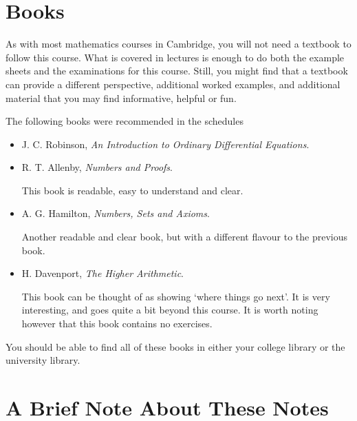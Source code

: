 \documentclass[a4paper]{scrreprt}
\begin{document}
\section{Books}

As with most mathematics courses in Cambridge, you will not need a textbook to follow this course. What is covered in lectures is enough to do both the example sheets and the examinations for this course. Still, you might find that a textbook can provide a different perspective, additional worked examples, and additional material that you may find informative, helpful or fun.

The following books were recommended in the schedules
\begin{itemize}
	\item J. C. Robinson, \emph{An Introduction to Ordinary Differential Equations}.

	\item R. T. Allenby, \emph{Numbers and Proofs}.
	
	This book is readable, easy to understand and clear.

	\item A. G. Hamilton, \emph{Numbers, Sets and Axioms}.
	
	Another readable and clear book, but with a different flavour to the previous book.

	\item H. Davenport, \emph{The Higher Arithmetic}.

	This book can be thought of as showing `where things go next'. It is very interesting, and goes quite a bit beyond this course. It is worth noting however that this book contains no exercises.
\end{itemize}

You should be able to find all of these books in either your college library or the university library.



\section{A Brief Note About These Notes}
\end{document}
